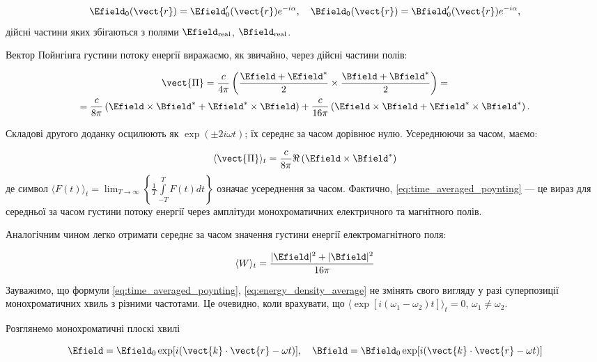 \begin{equation*}
\Efield_0(\vect{r}) = \Efield'_0(\vect{r}) e^{-i\alpha}, \quad \Bfield_0(\vect{r}) = \Bfield'_0(\vect{r}) e^{-i\alpha},
\end{equation*}
дійсні частини яких збігаються з полями \(\Efield_{\text{real}}\), \(\Bfield_{\text{real}}\).

Вектор Пойнгінга густини потоку енергії виражаємо, як звичайно, через дійсні частини полів:

\begin{multline*}
\vect{\Pi} = \frac{c}{4\pi} \left( \frac{\Efield + \Efield^{*}}{2} \times \frac{\Bfield + \Bfield^{*}}{2} \right) = \\
= \frac{c}{8\pi} \left( \Efield \times \Bfield^{*} + \Efield^{*} \times \Bfield \right) + \frac{c}{16\pi} \left( \Efield \times \Bfield +
\Efield^{*} \times \Bfield^{*} \right).
\end{multline*}

Складові другого доданку осцилюють як \(\exp(\pm 2i\omega t)\); їх середнє за часом дорівнює нулю. Усереднюючи за часом, маємо:

\begin{equation}
\langle \vect{\Pi} \rangle_t = \frac{c}{8\pi} \Re\left(\Efield \times \Bfield^{*}\right)
\label{eq:time_averaged_poynting}
\end{equation}
де символ \(\langle F(t) \rangle_t = \lim_{T \to \infty} \left\{ \frac{1}{T} \int\limits_{-T}^{T} F(t) dt \right\}\) означає усереднення за часом.
Фактично,
\eqref{eq:time_averaged_poynting} --- це вираз для середньої за часом густини потоку енергії через амплітуди монохроматичних електричного та магнітного
полів.

Аналогічним чином легко отримати середнє за часом значення густини енергії електромагнітного поля:

\begin{equation}
\langle W \rangle_t = \frac{\lvert \Efield \rvert^2 + \lvert \Bfield \rvert^2}{16\pi}
\label{eq:energy_density_average}
\end{equation}

Зауважимо, що формули \eqref{eq:time_averaged_poynting}, \eqref{eq:energy_density_average} не змінять свого вигляду у разі суперпозиції монохроматичних
хвиль з різними частотами. Це очевидно, коли врахувати, що \(\langle \exp[i(\omega_1 - \omega_2)t] \rangle_t = 0\), \(\omega_1 \neq \omega_2\).

Розглянемо монохроматичні плоскі хвилі

\begin{equation*}
\Efield = \Efield_0 \exp[i(\vect{k} \cdot \vect{r} - \omega t)], \quad \Bfield = \Bfield_0 \exp[i(\vect{k} \cdot \vect{r} - \omega t)]
\label{eq:monochromatic_waves}
\end{equation*}

